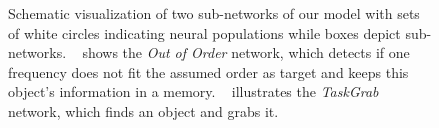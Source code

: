 \begin{figure}[t]
    \centering
    \caption{Schematic visualization of two sub-networks of our model with sets of white circles indicating neural populations while boxes depict sub-networks.
       ~\protect{} shows the \emph{Out of Order} network, which detects if one frequency does not fit the assumed order as target and keeps this object’s information in a memory.
~\protect{} illustrates the \emph{TaskGrab} network, which finds an object and grabs it.
}
    \label{fig:omni_bot_nets}
\end{figure}

